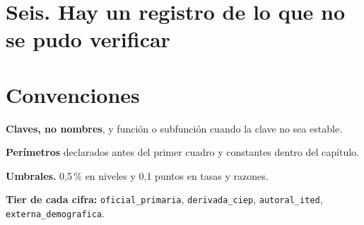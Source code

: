 \section*{Seis. Hay un registro de lo que no se pudo verificar}

\section*{Convenciones}

\begin{list}{}{\setlength{\leftmargin}{1.2em}\setlength{\itemsep}{1pt}}
\item[] \textbf{Claves, no nombres}, y función o subfunción cuando la clave no sea estable.
\item[] \textbf{Perímetros} declarados antes del primer cuadro y constantes dentro del capítulo.
\item[] \textbf{Umbrales.} 0,5\,\% en niveles y 0,1 puntos en tasas y razones.
\item[] \textbf{Tier de cada cifra:} \texttt{oficial\_primaria}, \texttt{derivada\_ciep},
\texttt{autoral\_ited}, \texttt{externa\_demografica}.
\end{list}
